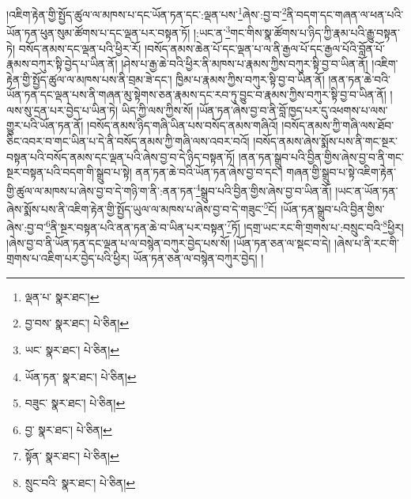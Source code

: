 །འཇིག་རྟེན་གྱི་སྤྱོད་ཚུལ་ལ་མཁས་པ་དང་ཡོན་ཏན་དང་:ལྡན་པས་\footnote{ལྡན་པ་  སྣར་ཐང་། }ཞེས་:བྱ་བ་\footnote{བྱ་བས་  སྣར་ཐང་།  པེ་ཅིན། }ནི་བདག་དང་གཞན་ལ་ཕན་པའི་ཡོན་ཏན་ཕུན་སུམ་ཚོགས་པ་དང་ལྡན་པར་བསྟན་ཏོ། །:ཡང་ན་\footnote{ཡང་  སྣར་ཐང་།  པེ་ཅིན། }གང་གིས་སྣ་ཚོགས་པ་ཉིད་ཀྱི་རྣམ་པའི་རྒྱུ་བསྟན་ཏེ། བསོད་ནམས་དང་ལྡན་པའི་ཕྱིར་རོ། །བསོད་ནམས་ཆེན་པོ་དང་ལྡན་པ་ལ་ནི་རྒྱལ་པོ་དང་རྒྱལ་པོའི་བློན་པོ་རྣམས་བཀུར་སྟི་བྱེད་པ་ཡིན་ནོ། །ཤེས་པ་རྒྱ་ཆེ་བའི་ཕྱིར་ནི་མཁས་པ་རྣམས་ཀྱིས་བཀུར་སྟི་བྱ་བ་ཡིན་ནོ། །འཇིག་རྟེན་གྱི་སྤྱོད་ཚུལ་ལ་མཁས་པས་ནི་བྲམ་ཟེ་དང་། ཁྱིམ་པ་རྣམས་ཀྱིས་བཀུར་སྟི་བྱ་བ་ཡིན་ནོ། །ནན་ཏན་ཆེ་བའི་ཡོན་ཏན་དང་ལྡན་པས་ནི་གཞན་མུ་སྟེགས་ཅན་རྣམས་དང་རབ་ཏུ་བྱུང་བ་རྣམས་ཀྱིས་བཀུར་སྟི་བྱ་བ་ཡིན་ནོ། །ལས་སུ་དྲན་པར་བྱེད་པ་ཡིན་ཏེ། ཡིད་ཀྱི་ལས་ཀྱིས་སོ། །ཡོན་ཏན་ཞེས་བྱ་བ་ནི་བློ་ཁྱད་པར་དུ་འཕགས་པ་ལས་གྱུར་པའི་ཡོན་ཏན་ནོ། །བསོད་ནམས་ཉིད་གཞི་ཡིན་པས་བསོད་ནམས་གཞིའོ། །བསོད་ནམས་ཀྱི་གཞི་ལས་ཐོབ་ཅིང་འབར་བ་གང་ཡིན་པ་དེ་ནི་བསོད་ནམས་ཀྱི་གཞི་ལས་འབར་བའོ། །བསོད་ནམས་ཞེས་སྨོས་པས་ནི་གང་སྔར་བསྟན་པའི་བསོད་ནམས་དང་ལྡན་པའི་ཞེས་བྱ་བ་དེ་ཉིད་བསྟན་ཏོ། །ནན་ཏན་སྒྲུབ་པའི་བྱིན་གྱིས་ཞེས་བྱ་བ་ནི་གང་སྔར་བསྟན་པའི་བདག་གི་སྒྲུབ་པ་སྟེ། ནན་ཏན་ཆེ་བའི་ཡོན་ཏན་ཞེས་བྱ་བ་དང་། གཞན་གྱི་སྒྲུབ་པ་སྟེ་འཇིག་རྟེན་གྱི་ཚུལ་ལ་མཁས་པ་ཞེས་བྱ་བ་དེ་གཉི་ག་ནི་:ནན་ཏན་\footnote{ཡོན་ཏན་  སྣར་ཐང་།  པེ་ཅིན། }སྒྲུབ་པའི་བྱིན་གྱིས་ཞེས་བྱ་བ་ཡིན་ནོ། །ཡང་ན་ཡོན་ཏན་ཞེས་སྨོས་པས་ནི་འཇིག་རྟེན་གྱི་སྤྱོད་ཡུལ་ལ་མཁས་པ་ཞེས་བྱ་བ་དེ་གཟུང་\footnote{བཟུང་  སྣར་ཐང་།  པེ་ཅིན། }ངོ། །ཡོན་ཏན་སྒྲུབ་པའི་བྱིན་གྱིས་ཞེས་:བྱ་བ་\footnote{བྱ་  སྣར་ཐང་།  པེ་ཅིན། }ནི་སྔར་བསྟན་པའི་ནན་ཏན་ཆེ་བ་ཡིན་པར་བསྟན་\footnote{སྟོན་  སྣར་ཐང་།  པེ་ཅིན། }ཏོ། །དགྲ་ཡང་རང་གི་གྲགས་པ་:བསྲུང་བའི་\footnote{སྲུང་བའི་  སྣར་ཐང་།  པེ་ཅིན། }ཕྱིར། །ཞེས་བྱ་བ་ནི་ཡོན་ཏན་དང་ལྡན་པ་ལ་བསྙེན་བཀུར་བྱེད་པས་སོ། །ཡོན་ཏན་ཅན་ལ་སྡང་བ་དེ། །ཞེས་པ་ནི་རང་གི་གྲགས་པ་འཇིག་པར་བྱེད་པའི་ཕྱིར། ཡོན་ཏན་ཅན་ལ་བསྙེན་བཀུར་བྱེད། །
